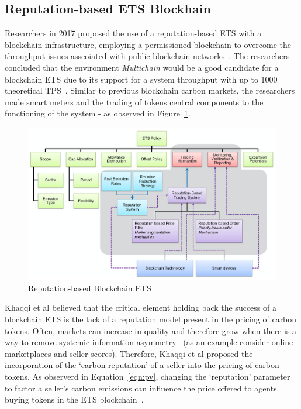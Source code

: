 \subsection{Reputation-based ETS Blockhain}

Researchers in 2017 proposed the use of a reputation-based
ETS with a blockchain infrastructure,
employing a permissioned blockchain to overcome
the throughput issues asscoiated with public
blockchain networks~\cite{KHAQQI20188}. The researchers concluded
that the environment \textit{Multichain} would be a good
candidate for a blockchain ETS due to its support for
a system throughput with up to 1000 theoretical TPS~\cite{KHAQQI20188}. Similar to
previous blockchain carbon markets, the researchers made smart
meters and the trading of tokens
central components to the functioning of
the system - as observed in Figure~\ref{fig:rep}.

\begin{figure}[ht]
    \centering
    \includegraphics[scale=0.37]{photos/reputation.png}
    \caption{Reputation-based Blockchain ETS}
    \label{fig:rep}
\end{figure}

Khaqqi et al believed that the critical element holding back
the success of a blockchain ETS is the lack of a reputation
model present in the pricing of carbon tokens. Often,
markets can increase in quality and therefore grow when there is a way
to remove systemic information asymmetry~\cite{KHAQQI20188}
(as an example consider online marketplaces and seller scores).
Therefore, Khaqqi et al proposed the incorporation of the
`carbon reputation' of a seller into the pricing of carbon tokens.
As observerd in Equation~\ref{eqn:pv}, changing the `reputation'
parameter to factor a seller's carbon emissions can influence the price
offered to agents buying tokens in the
ETS blockchain~\cite{KHAQQI20188}.

